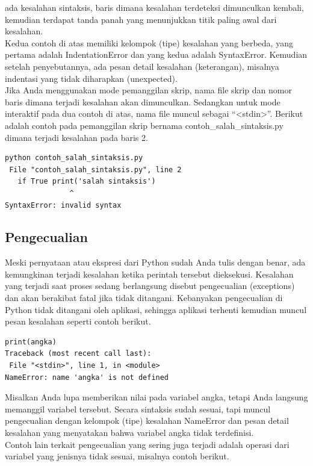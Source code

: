 ada kesalahan sintaksis, baris dimana kesalahan terdeteksi dimunculkan kembali, kemudian terdapat tanda panah yang menunjukkan titik paling awal dari kesalahan.\\

Kedua contoh di atas memiliki kelompok (tipe) kesalahan yang berbeda, yang pertama adalah IndentationError dan yang kedua adalah SyntaxError. Kemudian setelah penyebutannya, ada pesan detail kesalahan (keterangan), misalnya indentasi yang tidak diharapkan (unexpected).\\

Jika Anda menggunakan mode pemanggilan skrip, nama file skrip dan nomor baris dimana terjadi kesalahan akan dimunculkan. Sedangkan untuk mode interaktif pada dua contoh di atas, nama file muncul sebagai “<stdin>”. Berikut adalah contoh pada pemanggilan skrip bernama contoh\_salah\_sintaksis.py dimana terjadi kesalahan pada baris 2.\\

\begin{verbatim}
python contoh_salah_sintaksis.py  
 File "contoh_salah_sintaksis.py", line 2
   if True print('salah sintaksis')
               ^
SyntaxError: invalid syntax
\end{verbatim}

\subsection{Pengecualian}
Meski pernyataan atau ekspresi dari Python sudah Anda tulis dengan benar, ada kemungkinan terjadi kesalahan ketika perintah tersebut dieksekusi. Kesalahan yang terjadi saat proses sedang berlangsung disebut pengecualian (exceptions) dan akan berakibat fatal jika tidak ditangani. Kebanyakan pengecualian di Python tidak ditangani oleh aplikasi, sehingga aplikasi terhenti kemudian muncul pesan kesalahan seperti contoh berikut.\\
\begin{verbatim}
print(angka)
Traceback (most recent call last):
 File "<stdin>", line 1, in <module>
NameError: name 'angka' is not defined
\end{verbatim}
Misalkan Anda lupa memberikan nilai pada variabel angka, tetapi Anda langsung memanggil variabel tersebut. Secara sintaksis sudah sesuai, tapi muncul pengecualian dengan kelompok (tipe) kesalahan NameError dan pesan detail kesalahan yang menyatakan bahwa variabel angka tidak terdefinisi.\\

Contoh lain terkait pengecualian yang sering juga terjadi adalah operasi dari variabel yang jenisnya tidak sesuai, misalnya contoh berikut.\\

